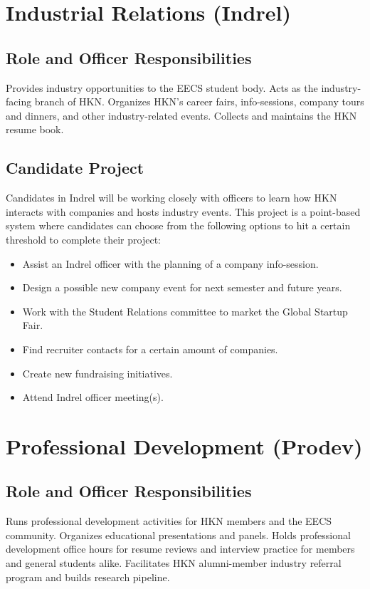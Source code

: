\documentclass[11pt, article, oneside]{memoir}
\begin{document}
    \bigbreak

    \section{Industrial Relations (Indrel)}
    \subsection{Role and Officer Responsibilities}
        Provides industry opportunities to the EECS student body. Acts as the industry-facing branch of HKN. Organizes HKN's career fairs, info-sessions, company tours and dinners, and other industry-related events. Collects and maintains the HKN resume book.

    \subsection{Candidate Project}
        Candidates in Indrel will be working closely with officers to learn how HKN interacts with companies and hosts industry events. This project is a point-based system where candidates can choose from the following options to hit a certain threshold to complete their project:
        \begin{itemize}
            \item Assist an Indrel officer with the planning of a company info-session.
            \item Design a possible new company event for next semester and future years.
            \item Work with the Student Relations committee to market the Global Startup Fair.
            \item Find recruiter contacts for a certain amount of companies.
            \item Create new fundraising initiatives.
            \item Attend Indrel officer meeting(s).
        \end{itemize}
    \bigbreak

    \section{Professional Development (Prodev)}
    \subsection{Role and Officer Responsibilities}
        Runs professional development activities for HKN members and the EECS community. Organizes educational presentations and panels. Holds professional development office hours for resume reviews and interview practice for members and general students alike. Facilitates HKN alumni-member industry referral program and builds research pipeline.
\end{document}

